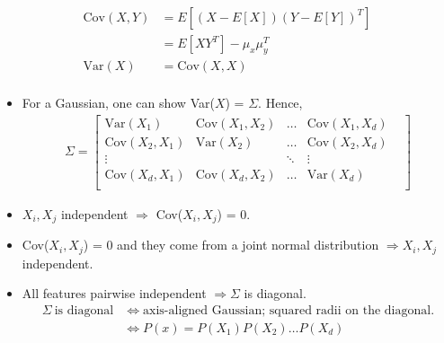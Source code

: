 \documentclass[10pt]{article}
\begin{document}
\begin{description}
\begin{itemize}
				\begin{align*}
					\text{Cov}(X, Y) &= E[(X - E[X])(Y - E[Y])^{T}]\\
									&= E[XY^{T}] - \mu_{x}\mu_{y}^{T}\\
					\text{Var}(X) &= \text{Cov}(X, X)\\
				\end{align*}
				\begin{itemize}
					\item For a Gaussian, one can show Var($X$) = $\Sigma$. Hence,
						\begin{align*}
							\Sigma =
								\begin{bmatrix}
									\text{Var}(X_{1}) & \text{Cov}(X_{1},X_{2}) & \dots & \text{Cov}(X_{1},X_{d})\\
									\text{Cov}(X_{2},X_{1})  & \text{Var}(X_{2}) & \dots & \text{Cov}(X_{2}, X_{d})\\
									\vdots & & \ddots & \vdots &\\
									\text{Cov}(X_{d},X_{1}) & \text{Cov}(X_{d},X_{2}) & \dots & \text{Var}(X_{d})\\
								\end{bmatrix}
						\end{align*}	
					\item $X_{i}, X_{j}$ independent $\Rightarrow$ Cov($X_{i}, X_{j}$) = 0.
					\item Cov($X_{i}, X_{j}$) = 0 and they come from a joint normal distribution $\Rightarrow X_{i}, X_{j}$ independent.
					\item All features pairwise independent $\Rightarrow \Sigma$ is diagonal.
						\begin{align*}
							\Sigma \ \text{is diagonal} &\Leftrightarrow \text{axis-aligned Gaussian; squared radii on the diagonal}.\\
							&\Leftrightarrow P(x) = P(X_{1})P(X_{2}) \dots P(X_{d})\\
						\end{align*}

\begin{center}						
\end{center}
\end{itemize}
\end{itemize}
\end{description}
\end{document}

